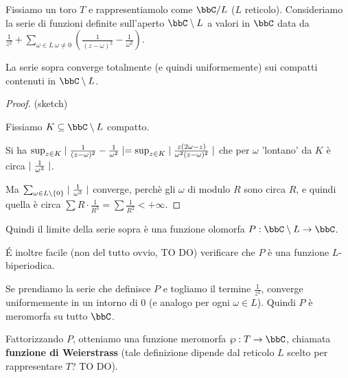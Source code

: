 Fissiamo un toro $T$ e rappresentiamolo come $\bbC/L$ ($L$ reticolo).
Consideriamo la serie di funzioni definite sull'aperto $\bbC\setminus L$ a valori in $\bbC$ data da $\frac{1}{z^2}+\sum_{\omega\in L\ \omega\not=0}(\frac{1}{(z-\omega)^2}-\frac{1}{\omega^2})$.

\begin{proposizione}
La serie sopra converge totalmente (e quindi uniformemente) sui compatti contenuti in $\bbC\setminus L$.
\end{proposizione}
\begin{proof}(sketch)

Fissiamo $K\subseteq\bbC\setminus L$ compatto.

Si ha $\sup_{z\in K}\mid \frac{1}{(z-\omega)^2}-\frac{1}{\omega^2} \mid=\sup_{z\in K}\mid \frac{z(2\omega-z)}{\omega^2(z-\omega)^2} \mid$ che per $\omega$ 'lontano' da $K$ è circa $\mid \frac{1}{\omega^3} \mid$.

Ma $\sum_{\omega\in L\setminus\{0\}}\mid \frac{1}{\omega^3} \mid$ converge, perchè
gli $\omega$ di modulo $R$ sono circa $R$, e quindi quella è circa $\sum R\cdot\frac{1}{R^3}=\sum\frac{1}{R^2}<+\infty$.
\end{proof}

Quindi il limite della serie sopra è una funzione olomorfa $P:\bbC\setminus L\rar\bbC$.

\'E inoltre facile (non del tutto ovvio, TO DO) verificare che $P$ è una funzione $L$-biperiodica.

Se prendiamo la serie che definisce $P$ e togliamo il termine $\frac{1}{z^2}$, converge uniformemente in un intorno di $0$ (e analogo per ogni $\omega\in L$).
Quindi $P$ è meromorfa su tutto $\bbC$.

Fattorizzando $P$, otteniamo una funzione meromorfa $\wp:T\rar\bbC$, chiamata \textbf{funzione di Weierstrass} (tale definizione dipende dal reticolo $L$ scelto per rappresentare $T$? TO DO).

